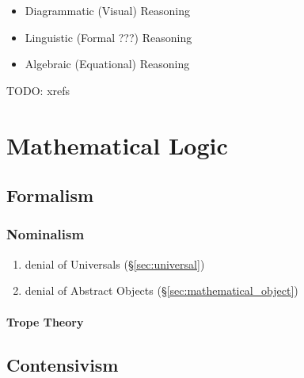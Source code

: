 \begin{itemize}
  \item Diagrammatic (Visual) Reasoning
  \item Linguistic (Formal ???) Reasoning
  \item Algebraic (Equational) Reasoning
\end{itemize}

TODO: xrefs



\section{Mathematical Logic}\label{sec:mathematical_logic}
\cite{curry77}

\subsection{Formalism}\label{sec:formalism}

\subsubsection{Nominalism}\label{sec:nominalism}

\begin{enumerate}
  \item denial of Universals (\S\ref{sec:universal})
  \item denial of Abstract Objects (\S\ref{sec:mathematical_object})
\end{enumerate}



\paragraph{Trope Theory}\label{sec:trope_theory}\hfill



\subsection{Contensivism}\label{sec:contensivism}

